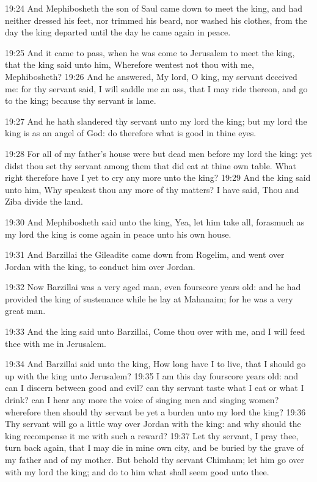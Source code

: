 19:24 And Mephibosheth the son of Saul came down to meet the king, and
had neither dressed his feet, nor trimmed his beard, nor washed his
clothes, from the day the king departed until the day he came again in
peace.

19:25 And it came to pass, when he was come to Jerusalem to meet the
king, that the king said unto him, Wherefore wentest not thou with me,
Mephibosheth?  19:26 And he answered, My lord, O king, my servant
deceived me: for thy servant said, I will saddle me an ass, that I may
ride thereon, and go to the king; because thy servant is lame.

19:27 And he hath slandered thy servant unto my lord the king; but my
lord the king is as an angel of God: do therefore what is good in
thine eyes.

19:28 For all of my father's house were but dead men before my lord
the king: yet didst thou set thy servant among them that did eat at
thine own table. What right therefore have I yet to cry any more unto
the king?  19:29 And the king said unto him, Why speakest thou any
more of thy matters? I have said, Thou and Ziba divide the land.

19:30 And Mephibosheth said unto the king, Yea, let him take all,
forasmuch as my lord the king is come again in peace unto his own
house.

19:31 And Barzillai the Gileadite came down from Rogelim, and went
over Jordan with the king, to conduct him over Jordan.

19:32 Now Barzillai was a very aged man, even fourscore years old: and
he had provided the king of sustenance while he lay at Mahanaim; for
he was a very great man.

19:33 And the king said unto Barzillai, Come thou over with me, and I
will feed thee with me in Jerusalem.

19:34 And Barzillai said unto the king, How long have I to live, that
I should go up with the king unto Jerusalem?  19:35 I am this day
fourscore years old: and can I discern between good and evil? can thy
servant taste what I eat or what I drink? can I hear any more the
voice of singing men and singing women? wherefore then should thy
servant be yet a burden unto my lord the king?  19:36 Thy servant will
go a little way over Jordan with the king: and why should the king
recompense it me with such a reward?  19:37 Let thy servant, I pray
thee, turn back again, that I may die in mine own city, and be buried
by the grave of my father and of my mother. But behold thy servant
Chimham; let him go over with my lord the king; and do to him what
shall seem good unto thee.

